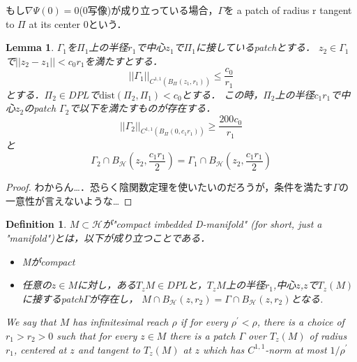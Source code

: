 \documentclass{ujarticle}
\newtheorem{dfn}[thm]{Definition}
\newtheorem{lem}[thm]{Lemma}
\newcommand{\bh}[2]{B_{\mathcal{H}}(#1,#2)}
\newcommand{\bp}[3]{B_{\Pi_{#3}}(#1,#2)}
\newcommand{\gn}[4]{||\Gamma_{#1}||_{C^{1,1}(\bp{#2}{#3}{#4})}}
\newcommand{\gnaaad}{||\Gamma_1||_{C^{1,1}(\bp{z_1}{r_1}{})}}
\begin{document}
もし$ \nabla \Psi(0)=0$(0写像)が成り立っている場合，$\Gamma$を
a patch of radius r tangent to $\Pi$ at its center 0という．

\begin{lem}
  $\Gamma_1$を$\Pi_1$上の半径$r_1$で中心$z_1$で$\Pi_1$に接しているpatchとする．
  $z_2 \in \Gamma_1$で$||z_2 -z_1 || < c_0r_1$を満たすとする．
  \begin{equation*}
   \gnaaad \le \frac{c_0}{r_1}
  \end{equation*}
  とする．$\Pi_2 \in DPL$で$\mathrm{dist}(\Pi_2,\Pi_1) <c_0$とする．
  この時，$\Pi_2$上の半径$c_1r_1$で中心$z_2$のpatch $\Gamma_2$で以下を満たすものが存在する．
  \begin{equation*}
   \gn{2}{0}{c_1r_1}{} \ge \frac{200c_0}{r_1}
  \end{equation*}
と
\begin{equation*}
\Gamma_2 \cap \bh{z_2}{\frac{c_1r_1}{2}} = \Gamma_1 \cap \bh{z_2}{\frac{c_1r_1}{2}}
\end{equation*}
\end{lem}
\begin{proof}
 わからん…．恐らく陰関数定理を使いたいのだろうが，条件を満たす$\Gamma$の一意性が言えないような…
\end{proof}

\begin{dfn}
  $M \subset \mathcal{H}$が"compact imbedded D-manifold" (for short, just a "manifold")とは，以下が成り立つことである．
\begin{itemize}
  \item Mがcompact
  \item 任意の$z \in M$に対し，ある$T_zM \in DPL$と，$T_zM$上の半径$r_1$,中心$z$,$z$で$T_z(M)$
  に接するpatch$\Gamma$が存在し，
  $M \cap B_{\mathcal{H}}(z,r_2)=\Gamma \cap B_{\mathcal{H}}(z,r_2)$となる.
\end{itemize}
We say that $M$ has infinitesimal reach $\rho$ if for every $\rho^{\prime} < \rho$, there is a choice of $r_1 > r_2 > 0$ such that
for every $z \in M$ there is a patch $\Gamma$ over $T_z(M)$ of radius $r_1$, centered at $z$ and tangent to $T_z(M)$ at $z$ which has $C^{1,1}$-norm at most $1/\rho^{\prime}$
\end{dfn}
\end{document}
